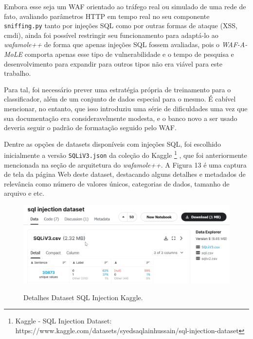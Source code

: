 Embora esse seja um WAF orientado ao tráfego real ou simulado de uma rede de fato, avaliando parâmetros HTTP em tempo real no seu componente \verb+sniffing.py+ tanto por injeções SQL como por outras formas de ataque (XSS, cmdi), ainda foi possível restringir seu funcionamento para adaptá-lo ao \textit{wafamole++} de forma que apenas injeções SQL fossem avaliadas, pois o \textit{WAF-A-MoLE} comporta apenas esse tipo de vulnerabilidade e o tempo de pesquisa e desenvolvimento para expandir para outros tipos não era viável para este trabalho.

Para tal, foi necessário prever uma estratégia própria de treinamento para o classificador, além de um conjunto de dados especial para o mesmo. É cabível mencionar, no entanto, que isso introduziu uma série de dificuldades uma vez que sua documentação era consideravelmente modesta, e o banco novo a ser usado deveria seguir o padrão de formatação seguido pelo WAF.

Dentre as opções de datasets disponíveis com injeções SQL, foi escolhido inicialmente a versão \verb+SQLiV3.json+ da coleção do Kaggle \footnote{Kaggle - SQL Injection Dataset: https://www.kaggle.com/datasets/syedsaqlainhussain/sql-injection-dataset} \cite{kaggle_dataset_sql}, que foi anteriormente mencionada na seção de arquitetura do \textit{wafamole++}. A Figura 13 é uma captura de tela da página Web deste dataset, destacando alguns detalhes e metadados de relevância como número de valores únicos, categorias de dados, tamanho de arquivo e etc.

\begin{figure}[ht]
    \centering
    \caption{Detalhes Dataset SQL Injection Kaggle.}
    \includegraphics[width=16cm]{figuras/sqlInjectionDataset.png} 
    \label{fig:internet} 
\end{figure}

